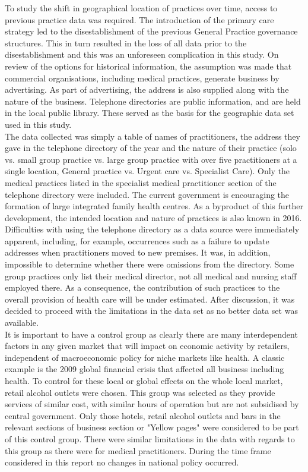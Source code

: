 \documentclass[11pt,a4paper]{article}
\begin{document}
To study the shift in geographical location of practices over time, access to previous practice data was required. The introduction of the primary care strategy led to the disestablishment of the previous General Practice governance structures. This in turn resulted in the loss of all data prior to the disestablishment and this was an unforeseen complication in this study. On review of the options for historical information, the assumption was made that commercial organisations, including medical practices, generate business by advertising. As part of advertising, the address is also supplied along with the nature of the business. Telephone directories are public information, and are held in the local public library. These served as the basis for the geographic data set used in this study.\\

The data collected was simply a table of names of practitioners, the address they gave in the telephone directory of the year and the nature of their practice (solo vs. small group practice vs. large group practice with over five practitioners at a single location,  General practice vs. Urgent care vs. Specialist Care). Only the  medical practices listed in the specialist medical practitioner section of the telephone directory were included. The current government is encouraging the formation of large integrated family health centres. As a byproduct of this further development, the intended location and nature of practices is also known in 2016.\\

Difficulties with using the telephone directory as a data source were immediately apparent, including, for example, occurrences such as a failure to update addresses when practitioners moved to new premises. It was, in addition,  impossible to determine whether there were omissions from the directory. Some group practices only list their medical director, not all medical and nursing staff employed there. As a consequence, the contribution of such practices to the overall provision of health care will be under estimated.  After discussion, it was decided to proceed with the limitations in the data set as no better data set was available.  \\

It is important to have a control group as clearly there are many interdependent factors in any given market that will impact on economic activity by retailers, independent of macroeconomic policy for niche markets like health. A classic example is the 2009 global financial crisis that affected all business including health. To control for these local or global effects on the whole local market, retail alcohol outlets were chosen.  This group was selected as they provide services of similar cost, with similar hours of operation but are not subsidised by central government. Only those hotels, retail alcohol outlets and bars in the relevant sections of business section or "Yellow pages" were considered to be part of this control group. There were similar limitations in the data with regards to this group as there were for medical practitioners. During the time frame considered in this report no changes in national policy occurred.\\
\end{document}
